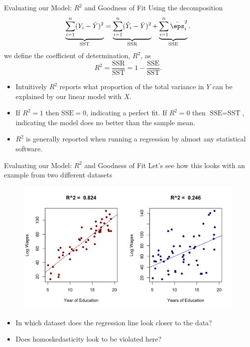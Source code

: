 \documentclass[notheorems, 9pt]{beamer}
\begin{document}
\begin{frame}{Evaluating our Model: \(R^2\) and Goodness of Fit} 
	\label{frame:f11}
	Using the decomposition
	\[
		\underbrace{\sum_{i=1}^n (Y_i - \bar Y)^2}_{\text{SST}} = \underbrace{\sum_{i=1}^n  (\hat Y_i - \bar Y)^2}_{\text{SSR}} +\underbrace{\sum_{i=1}^n \hat\eps_i^2}_{\text{SSE}}
	.\] 
	we define the coefficient of determination, \(R^2\), as
	\[
		R^2 = \frac{\text{SSR}}{\text{SST}} = 1 - \frac{\text{SSE}}{\text{SST}}  
	.\]
	\onslide<2->
	\begin{itemize}
		\item<2-> Intuitively \(R^2\) reports what proportion of the total variance in  \(Y\) can be explained by our linear model with  \(X\).
		\item<3-> If \(R^2=1\) then  \(\text{SSE} = 0\), indicating a perfect fit. If \(R^2=0\) then  \(\text{SSE} = \text{SST}\), indicating the model does no better than the sample mean.
		\item<4-> \(R^2\) is generally reported when running a regression by almost any statistical software.
	\end{itemize}
\end{frame}
\begin{frame}{Evaluating our Model: \(R^2\) and Goodness of Fit} 
	\label{frame:f12}
	Let's see how this looks with an example from two different datasets
	\begin{figure}[htpb]
		\centering
		\includegraphics[width=0.8\linewidth]{R2.png}
	\end{figure}
	\begin{itemize}
		\item<2-> In which dataset does the regression line look closer to the data?
		\item<3-> Does homoskedasticity look to be violated here?
	\end{itemize}
\end{frame}
\end{document}
